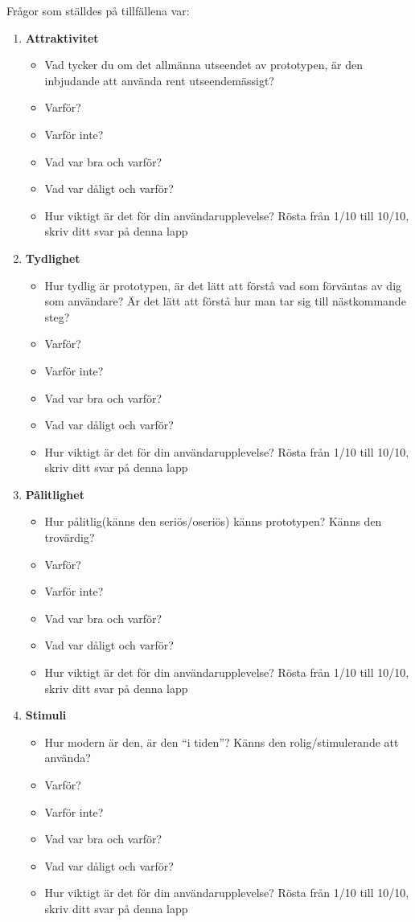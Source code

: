 Frågor som ställdes på tillfällena var: 
\newline
\begin{enumerate}
\item \textbf{Attraktivitet}
\begin{itemize}  
\item Vad tycker du om det allmänna utseendet av prototypen, är den inbjudande att använda rent utseendemässigt?
\item Varför?
\item Varför inte?
\item Vad var bra och varför? 
\item Vad var dåligt och varför?
\item Hur viktigt är det för din användarupplevelse? Rösta från 1/10 till 10/10, skriv ditt svar på denna lapp
\end{itemize}

\item \textbf{Tydlighet}
\begin{itemize}  
\item Hur tydlig är prototypen, är det lätt att förstå vad som förväntas av dig som användare? Är det lätt att förstå hur man tar sig till nästkommande steg?
\item Varför?
\item Varför inte?
\item Vad var bra och varför? 
\item Vad var dåligt och varför?
\item Hur viktigt är det för din användarupplevelse? Rösta från 1/10 till 10/10, skriv ditt svar på denna lapp
\end{itemize}

\item \textbf{Pålitlighet}
\begin{itemize}  
\item Hur pålitlig(känns den seriös/oseriös) känns prototypen? Känns den trovärdig? 
\item Varför?
\item Varför inte?
\item Vad var bra och varför? 
\item Vad var dåligt och varför?
\item Hur viktigt är det för din användarupplevelse? Rösta från 1/10 till 10/10, skriv ditt svar på denna lapp
\end{itemize}

\item \textbf{Stimuli}
\begin{itemize}  
\item Hur modern är den, är den “i tiden”? Känns den rolig/stimulerande att använda? 
\item Varför?
\item Varför inte?
\item Vad var bra och varför? 
\item Vad var dåligt och varför?
\item Hur viktigt är det för din användarupplevelse? Rösta från 1/10 till 10/10, skriv ditt svar på denna lapp
\end{itemize}


\end{enumerate}
